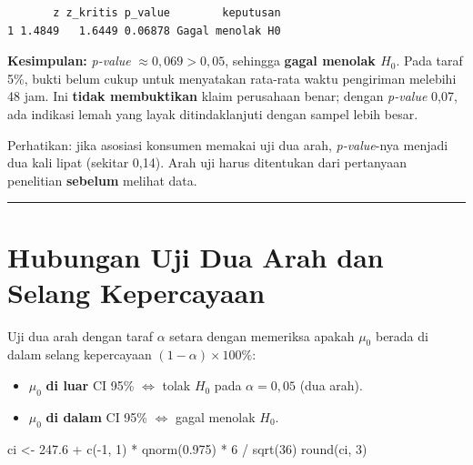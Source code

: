 \documentclass[
  indonesian,
  letterpaper,
]{book}
\newenvironment{Shaded}{\begin{snugshade}}{\end{snugshade}}
\newcommand{\DecValTok}[1]{\textcolor[rgb]{0.68,0.00,0.00}{#1}}
\newcommand{\FloatTok}[1]{\textcolor[rgb]{0.68,0.00,0.00}{#1}}
\newcommand{\FunctionTok}[1]{\textcolor[rgb]{0.28,0.35,0.67}{#1}}
\newcommand{\NormalTok}[1]{\textcolor[rgb]{0.00,0.23,0.31}{#1}}
\newcommand{\OtherTok}[1]{\textcolor[rgb]{0.00,0.23,0.31}{#1}}
\newcommand{\SpecialCharTok}[1]{\textcolor[rgb]{0.37,0.37,0.37}{#1}}
\providecommand{\tightlist}{%
  \setlength{\itemsep}{0pt}\setlength{\parskip}{0pt}}
\begin{document}
\begin{verbatim}
       z z_kritis p_value        keputusan
1 1.4849   1.6449 0.06878 Gagal menolak H0
\end{verbatim}

\textbf{Kesimpulan:} \emph{p-value} \(\approx 0{,}069 > 0{,}05\),
sehingga \textbf{gagal menolak \(H_0\)}. Pada taraf 5\%, bukti belum
cukup untuk menyatakan rata-rata waktu pengiriman melebihi 48 jam. Ini
\textbf{tidak membuktikan} klaim perusahaan benar; dengan \emph{p-value}
0,07, ada indikasi lemah yang layak ditindaklanjuti dengan sampel lebih
besar.

Perhatikan: jika asosiasi konsumen memakai uji dua arah,
\emph{p-value}-nya menjadi dua kali lipat (sekitar 0,14). Arah uji harus
ditentukan dari pertanyaan penelitian \textbf{sebelum} melihat data.

\begin{center}\rule{0.5\linewidth}{0.5pt}\end{center}

\section{Hubungan Uji Dua Arah dan Selang
Kepercayaan}\label{hubungan-uji-dua-arah-dan-selang-kepercayaan}

Uji dua arah dengan taraf \(\alpha\) setara dengan memeriksa apakah
\(\mu_0\) berada di dalam selang kepercayaan \((1-\alpha)\times 100\%\):

\begin{itemize}
\tightlist
\item
  \(\mu_0\) \textbf{di luar} CI 95\% \(\iff\) tolak \(H_0\) pada
  \(\alpha = 0{,}05\) (dua arah).
\item
  \(\mu_0\) \textbf{di dalam} CI 95\% \(\iff\) gagal menolak \(H_0\).
\end{itemize}

\begin{Shaded}
\begin{Highlighting}[]
\NormalTok{ci }\OtherTok{\textless{}{-}} \FloatTok{247.6} \SpecialCharTok{+} \FunctionTok{c}\NormalTok{(}\SpecialCharTok{{-}}\DecValTok{1}\NormalTok{, }\DecValTok{1}\NormalTok{) }\SpecialCharTok{*} \FunctionTok{qnorm}\NormalTok{(}\FloatTok{0.975}\NormalTok{) }\SpecialCharTok{*} \DecValTok{6} \SpecialCharTok{/} \FunctionTok{sqrt}\NormalTok{(}\DecValTok{36}\NormalTok{)}
\FunctionTok{round}\NormalTok{(ci, }\DecValTok{3}\NormalTok{)}
\end{Highlighting}
\end{Shaded}
\end{document}
